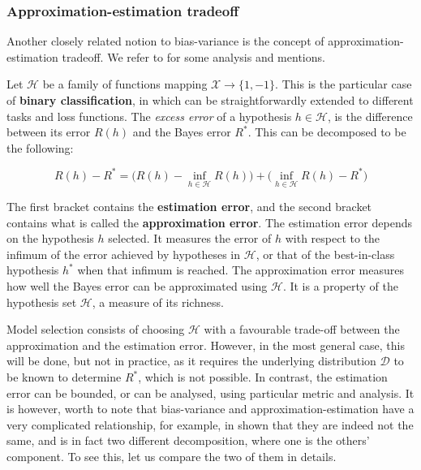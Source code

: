 \documentclass[
  journal=largetwo,
  year=2025,
  volume=37,
]{cup-journal}
\begin{document}
\subsubsection{Approximation-estimation tradeoff}

Another closely related notion to bias-variance is the concept of approximation-estimation tradeoff. We refer to \cite{10.5555/2371238,lafon_understanding_2024} for some analysis and mentions. 

Let $\mathcal{H}$ be a family of functions mapping $\mathcal{X}\to\{1,-1\}$. This is the particular case of \textbf{binary classification}, in which can be straightforwardly extended to different tasks and loss functions. The \textit{excess error} of a hypothesis $h\in\mathcal{H}$, is the difference between its error $R(h)$ and the Bayes error $R^{*}$. This can be decomposed to be the following: 

\begin{equation}
    R(h) - R^{*} = \Big( R(h) - \inf_{h\in \mathcal{H}} R(h) \Big) + \Big( \inf_{h\in \mathcal{H}} R(h) - R^{*} \Big)
\end{equation}

The first bracket contains the \textbf{estimation error}, and the second bracket contains what is called the \textbf{approximation error}. The estimation error depends on the hypothesis $h$ selected. It measures the error of $h$ with respect to the infimum of the error achieved by hypotheses in $\mathcal{H}$, or that of the best-in-class hypothesis $h^{*}$ when that infimum is reached. The approximation error measures how well the Bayes error can be approximated using $\mathcal{H}$. It is a property of the hypothesis set $\mathcal{H}$, a measure of its richness. 

Model selection consists of choosing $\mathcal{H}$ with a favourable trade-off between the approximation and the estimation error. However, in the most general case, this will be done, but not in practice, as it requires the underlying distribution $\mathcal{D}$ to be known to determine $R^{*}$, which is not possible. In contrast, the estimation error can be bounded, or can be analysed, using particular metric and analysis. It is however, worth to note that bias-variance and approximation-estimation have a very complicated relationship, for example, in \cite{brown2024biasvariance} shown that they are indeed not the same, and is in fact two different decomposition, where one is the others' component. To see this, let us compare the two of them in details. 
\end{document}
